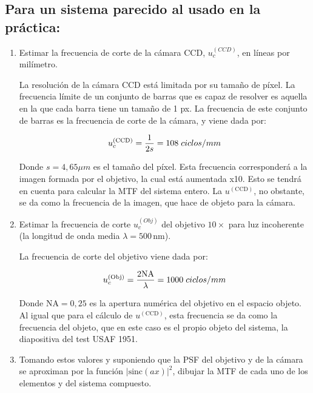 \documentclass{./packages/optica-article}
\newcommand{\sinc}{\textrm{sinc}}
\begin{document}
\subsection{Para un sistema parecido al usado en la práctica:}\label{sec:cuestion:mtf}
	\begin{enumerate}
		\item Estimar la frecuencia de corte de la cámara CCD, $u_{c}^{(CCD)}$, en líneas por milímetro.

	    La resolución de la cámara CCD está limitada por su tamaño de píxel. La frecuencia límite de un conjunto de barras que es capaz de resolver es aquella en la que cada barra tiene un tamaño de 1 px. La frecuencia de este conjunto de barras es la frecuencia de corte de la cámara, y viene dada por:

	    \begin{equation}
	        u_c^{(\textrm{CCD})} = \frac{1}{2s} = 108 \flatfrac{ciclos}{mm}
	    \end{equation}

		Donde $s=4,65 \mu m$ es el tamaño del píxel. Esta frecuencia corresponderá a la imagen formada por el objetivo, la cual está aumentada x10. Esto se tendrá en cuenta para calcular la MTF del sistema entero. La $u^{(\textrm{CCD})}$, no obstante, se da como la frecuencia de la imagen, que hace de objeto para la cámara.

		\item Estimar la frecuencia de corte $u_{c}^{(Obj)}$ del objetivo $10\times$ para luz incoherente (la longitud de onda media $\lambda=500\,\unit{\nano\metre}$).

		La frecuencia de corte del objetivo viene dada por:

		\begin{equation}
		    u_c^{(\textrm{Obj})} = \frac{2 \textrm{NA}}{\lambda} = 1000 \flatfrac{ciclos}{mm}
		\end{equation}

		Donde $\textrm{NA}=0,25$ es la apertura numérica del objetivo en el espacio objeto. Al igual que para el cálculo de $u^{(\textrm{CCD})}$, esta frecuencia se da como la frecuencia del objeto, que en este caso es el propio objeto del sistema, la diapositiva del test USAF 1951.

		\item Tomando estos valores y suponiendo que la PSF del objetivo y de la cámara se aproximan por la función $|\sinc(ax)|^2$, dibujar la MTF de cada uno de los elementos y del sistema compuesto.


\end{enumerate}
\end{document}
